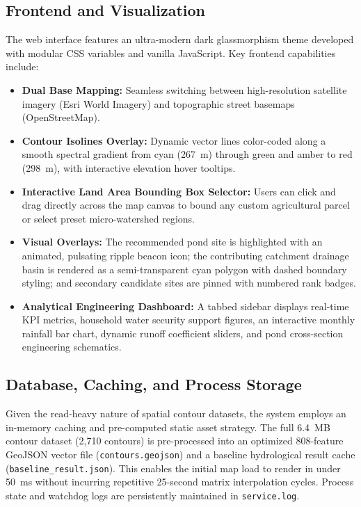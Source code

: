 \documentclass[manuscript,screen,review]{acmart}
\begin{document}
\subsection{Frontend and Visualization}
The web interface features an ultra-modern dark glassmorphism theme developed with modular CSS variables and vanilla JavaScript. Key frontend capabilities include:
\begin{itemize}
    \item \textbf{Dual Base Mapping:} Seamless switching between high-resolution satellite imagery (Esri World Imagery) and topographic street basemaps (OpenStreetMap).
    \item \textbf{Contour Isolines Overlay:} Dynamic vector lines color-coded along a smooth spectral gradient from cyan (267~m) through green and amber to red (298~m), with interactive elevation hover tooltips.
    \item \textbf{Interactive Land Area Bounding Box Selector:} Users can click and drag directly across the map canvas to bound any custom agricultural parcel or select preset micro-watershed regions.
    \item \textbf{Visual Overlays:} The recommended pond site is highlighted with an animated, pulsating ripple beacon icon; the contributing catchment drainage basin is rendered as a semi-transparent cyan polygon with dashed boundary styling; and secondary candidate sites are pinned with numbered rank badges.
    \item \textbf{Analytical Engineering Dashboard:} A tabbed sidebar displays real-time KPI metrics, household water security support figures, an interactive monthly rainfall bar chart, dynamic runoff coefficient sliders, and pond cross-section engineering schematics.
\end{itemize}

\subsection{Database, Caching, and Process Storage}
Given the read-heavy nature of spatial contour datasets, the system employs an in-memory caching and pre-computed static asset strategy. The full 6.4~MB contour dataset (2,710 contours) is pre-processed into an optimized 808-feature GeoJSON vector file (\texttt{contours.geojson}) and a baseline hydrological result cache (\texttt{baseline\_result.json}). This enables the initial map load to render in under 50~ms without incurring repetitive 25-second matrix interpolation cycles. Process state and watchdog logs are persistently maintained in \texttt{service.log}.
\end{document}
